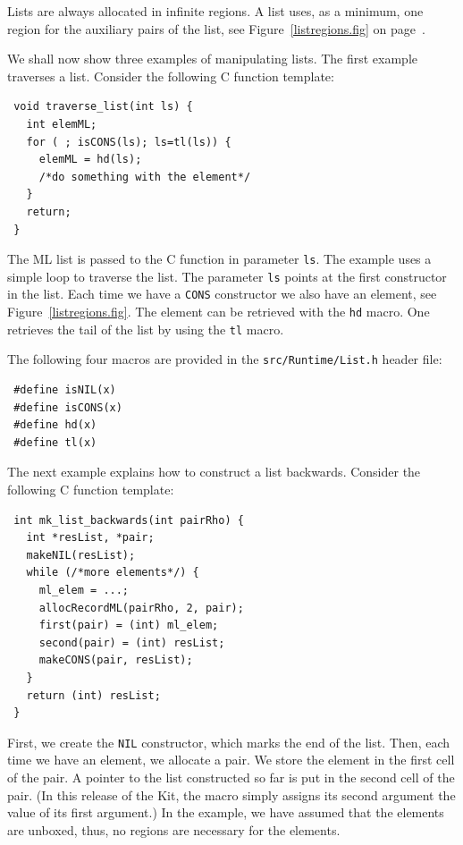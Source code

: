 \documentclass[12pt]{book}
\begin{document}
Lists are always allocated in infinite regions. A list uses, as a minimum,
one region for the auxiliary pairs of the list, see Figure~\ref{listregions.fig} on page~\pageref{listregions.fig}.

We shall now show three examples of manipulating lists. The first example
traverses a list. Consider the following C function template:
%
\begin{verbatim}
 void traverse_list(int ls) {
   int elemML;
   for ( ; isCONS(ls); ls=tl(ls)) {
     elemML = hd(ls);
     /*do something with the element*/
   }
   return;
 }
\end{verbatim}

The ML list is passed to the C function in parameter \texttt{ls}.
The example uses a simple loop to traverse the list. The parameter
\texttt{ls} points at the first constructor in the list. Each time
we have a \texttt{CONS} constructor we also have an element, see
Figure~\ref{listregions.fig}. The element can be retrieved with the
\texttt{hd} macro.  One retrieves the tail of the list by using the
\texttt{tl} macro.

The following four macros are provided in the {\tt src/Runtime/List.h}
header file:
%
%
%
%
\begin{verbatim}
 #define isNIL(x)
 #define isCONS(x)
 #define hd(x)
 #define tl(x)
\end{verbatim}
                                
The next example explains how to construct a list backwards. Consider
the following C function template:
%
\begin{verbatim}
 int mk_list_backwards(int pairRho) {
   int *resList, *pair;
   makeNIL(resList);  
   while (/*more elements*/) {
     ml_elem = ...;
     allocRecordML(pairRho, 2, pair);
     first(pair) = (int) ml_elem;
     second(pair) = (int) resList;
     makeCONS(pair, resList);
   }
   return (int) resList;
 }
\end{verbatim}
First, we create the \texttt{NIL} constructor, which marks the end of
the list. Then, each time we have an element, we allocate a pair. We
store the element in the first cell of the pair. A pointer to the list
constructed so far is put in the second cell of the pair. (In this
release of the Kit, the  macro simply assigns its
second argument the value of its first argument.) In the example, we
have assumed that the elements are unboxed, thus, no regions are
necessary for the elements.
\end{document}
